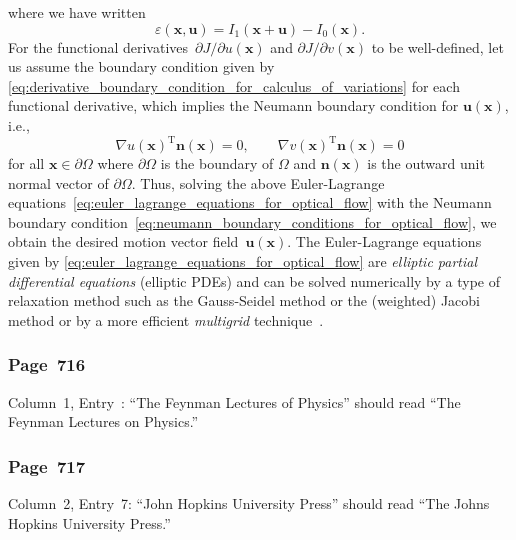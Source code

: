 \documentclass[12pt,a4paper]{article}
\newcommand{\erratum}[1]{\subsubsection*{#1}}
\begin{document}
where we have written
\begin{equation}
\varepsilon\left(\mathbf{x}, \mathbf{u}\right) = I_1(\mathbf{x} + \mathbf{u}) - I_0(\mathbf{x}).
\end{equation}
For the functional derivatives~$\partial J / \partial u(\mathbf{x})$ and
$\partial J / \partial v(\mathbf{x})$ to be well-defined,
let us assume the boundary condition given by
\eqref{eq:derivative_boundary_condition_for_calculus_of_variations} for each functional derivative,
which implies the Neumann boundary condition for $\mathbf{u}(\mathbf{x})$, i.e.,
\begin{equation}
{\nabla u(\mathbf{x})}^{\operatorname{T}} \mathbf{n}(\mathbf{x}) = 0, \qquad
{\nabla v(\mathbf{x})}^{\operatorname{T}} \mathbf{n}(\mathbf{x}) = 0
\label{eq:neumann_boundary_conditions_for_optical_flow}
\end{equation}
for all $\mathbf{x} \in \partial\Omega$
where $\partial\Omega$ is the boundary of $\Omega$ and
$\mathbf{n}(\mathbf{x})$ is the outward unit normal vector of $\partial\Omega$.
Thus, solving the above Euler-Lagrange
equations~\eqref{eq:euler_lagrange_equations_for_optical_flow}
with the Neumann boundary condition~\eqref{eq:neumann_boundary_conditions_for_optical_flow},
we obtain the desired motion vector field~$\mathbf{u}(\mathbf{x})$.
The Euler-Lagrange equations given by \eqref{eq:euler_lagrange_equations_for_optical_flow} are
\emph{elliptic partial differential equations} (elliptic PDEs) and can be solved numerically by
a type of relaxation method such as the Gauss-Seidel method or the (weighted) Jacobi method or
by a more efficient \emph{multigrid} technique~\citep{Press:NR,Briggs:MultigridTutorial}.

\erratum{Page~716}
Column~1, Entry~:
``The Feynman Lectures of Physics'' should read ``The Feynman Lectures on Physics.''

\erratum{Page~717}
Column~2, Entry~7:
``John Hopkins University Press'' should read ``The Johns Hopkins University Press.''



\end{document}
